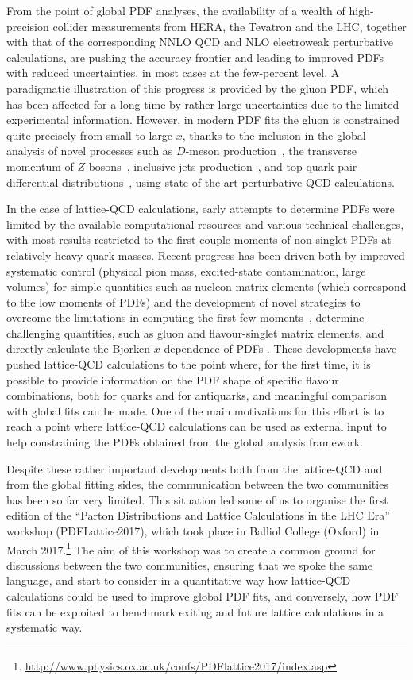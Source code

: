 From the point of
global PDF analyses, the availability of a wealth of high-precision collider measurements
from HERA, the Tevatron and the LHC, together with that of the corresponding
NNLO QCD and NLO electroweak perturbative calculations, are pushing the
accuracy frontier and leading to improved PDFs with reduced uncertainties,
in most cases at the few-percent level.
%
A paradigmatic illustration of this progress is provided by the gluon PDF, which has been
affected for a long time by rather large uncertainties due to the limited experimental
information.
%
However, in modern PDF fits the gluon is
constrained quite precisely from small to large-$x$,
thanks to the inclusion in the
global analysis of novel processes such as $D$-meson
production~\cite{Zenaiev:2015rfa,Gauld:2016kpd},
the transverse momentum of $Z$ bosons~\cite{Boughezal:2017nla},
inclusive jets production~\cite{Currie:2016bfm},
and top-quark pair differential
distributions~\cite{Czakon:2016olj,Guzzi:2014wia}, using state-of-the-art
perturbative QCD calculations.

In the case of lattice-QCD calculations, early attempts to determine PDFs were limited by the 
available computational resources and various technical challenges, with most results restricted to
the first couple moments of non-singlet PDFs at relatively heavy quark masses.
%
Recent progress has been driven both
by improved systematic control (physical pion mass, excited-state contamination, large volumes) 
for simple quantities such as nucleon matrix elements (which correspond to the low moments of PDFs) and the development of novel
strategies to overcome the limitations in computing the first few 
moments~\cite{Constantinou:2014tga,Syritsyn:2014saa,Lin:2012ev}, determine challenging quantities, 
such as gluon and flavour-singlet matrix elements, and directly calculate the Bjorken-$x$ dependence of PDFs \cite{Lin:2014zya,Alexandrou:2015rja,Chen:2016utp,Alexandrou:2016jqi}.
%
These developments have pushed lattice-QCD calculations
to the point where, for the first time, it is possible to provide information on the PDF shape
of specific flavour combinations, both for quarks and for antiquarks, and meaningful comparison with 
global fits can be made.
%
One of the main motivations for this effort is to reach a point where lattice-QCD
calculations can be used as external input to help constraining the
PDFs obtained from the global analysis framework.

Despite these rather important developments both from the lattice-QCD
and from the global fitting sides,
the communication between the
two communities has been so far very limited.
%
This situation led some of us
to organise the first edition of the
``Parton Distributions and Lattice Calculations in the LHC Era''
workshop (PDFLattice2017), which took
place in Balliol College (Oxford) in March
2017.\footnote{\url{http://www.physics.ox.ac.uk/confs/PDFlattice2017/index.asp}}
%
The aim of this workshop was to create a common ground for discussions
between the two communities, ensuring that we spoke the same language,
and start to consider in a quantitative way how lattice-QCD calculations could be used
to improve global PDF fits, and conversely, how PDF fits can be exploited to benchmark
exiting and future lattice calculations in a systematic way.

